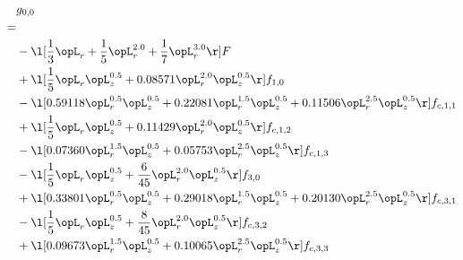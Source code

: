 \begin{alignat}{2} 
\label{eq:g_00_0} 
& g_{0,0} \nonumber \\ 
 = \\ 
& - \l[ \frac{1}{3} \opL_r + \frac{1}{5} \opL_r^{2.0} + \frac{1}{7} \opL_r^{3.0}  \r] F \nonumber \\ 
& + \l[ \frac{1}{5} \opL_r \opL_z^{0.5} +  0.08571 \opL_r^{2.0} \opL_z^{0.5}  \r] f_{1,0} \nonumber \\ 
& - \l[  0.59118 \opL_r^{0.5} \opL_z^{0.5} +  0.22081 \opL_r^{1.5} \opL_z^{0.5} +  0.11506 \opL_r^{2.5} \opL_z^{0.5}  \r] f_{c,1,1} \nonumber \\ 
& + \l[ \frac{1}{5} \opL_r \opL_z^{0.5} +  0.11429 \opL_r^{2.0} \opL_z^{0.5}  \r] f_{c,1,2} \nonumber \\ 
& - \l[  0.07360 \opL_r^{1.5} \opL_z^{0.5} +  0.05753 \opL_r^{2.5} \opL_z^{0.5}  \r] f_{c,1,3} \nonumber \\ 
& - \l[ \frac{1}{5} \opL_r \opL_z^{0.5} + \frac{6}{45} \opL_r^{2.0} \opL_z^{0.5}  \r] f_{3,0} \nonumber \\ 
& + \l[  0.33801 \opL_r^{0.5} \opL_z^{0.5} +  0.29018 \opL_r^{1.5} \opL_z^{0.5} +  0.20130 \opL_r^{2.5} \opL_z^{0.5}  \r] f_{c,3,1} \nonumber \\ 
& - \l[ \frac{1}{5} \opL_r \opL_z^{0.5} + \frac{8}{45} \opL_r^{2.0} \opL_z^{0.5}  \r] f_{c,3,2} \nonumber \\ 
& + \l[  0.09673 \opL_r^{1.5} \opL_z^{0.5} +  0.10065 \opL_r^{2.5} \opL_z^{0.5}  \r] f_{c,3,3} \nonumber \\ 
\end{alignat} 


